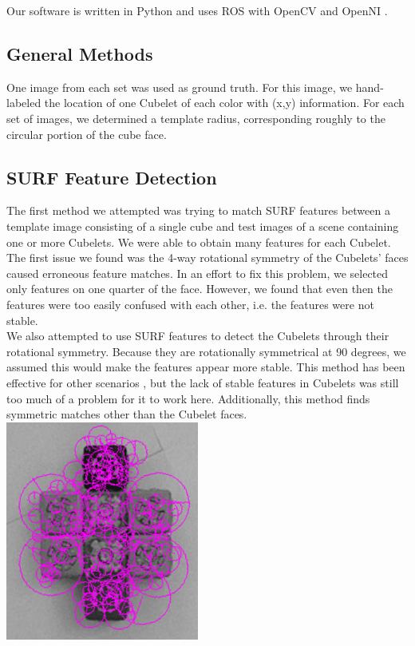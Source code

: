 \documentclass[conference]{IEEEtran}
\begin{document}
Our software is written in Python and uses ROS with OpenCV \cite{OpenCV} and OpenNI \cite{OpenNI}.

\subsection{General Methods}
One image from each set was used as ground truth. For this image, we hand-labeled the location of one Cubelet of each color with (x,y) information. For each set of images, we determined a template radius, corresponding roughly to the circular portion of the cube face.  

\subsection{SURF Feature Detection}
The first method we attempted was trying to match SURF features between a template image consisting of a single cube and test images of a scene containing one or more Cubelets. We were able to obtain many features for each Cubelet. The first issue we found was the 4-way rotational symmetry of the Cubelets' faces caused erroneous feature matches. In an effort to fix this problem, we selected only features on one quarter of the face. However, we found that even then the features were too easily confused with each other, i.e. the features were not stable.\\

We also attempted to use SURF features to detect the Cubelets through their rotational symmetry.  Because they are rotationally symmetrical at 90 degrees, we assumed this would make the features appear more stable. This method has been effective for other scenarios \cite{Loy_Eklundh}, but the lack of stable features in Cubelets was still too much of a problem for it to work here. Additionally, this method finds symmetric matches other than the Cubelet faces.\\ 

{\includegraphics[width=2.5in]{surf.png}} \\
\end{document}
